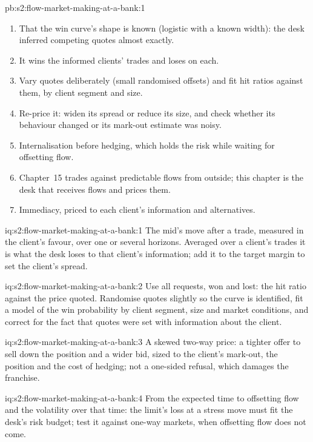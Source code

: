 \begin{solution}{pb:s2:flow-market-making-at-a-bank:1}
\begin{enumerate}
informed out, and internalises 90.8\% of its volume, 96.8\% with a 0.05 skew.
\item That the win curve's shape is known (logistic with a known width): the desk inferred competing quotes almost exactly.
\item It wins the informed clients' trades and loses on each.
\item Vary quotes deliberately (small randomised offsets) and fit hit ratios against them, by client segment and size.
\item Re-price it: widen its spread or reduce its size, and check whether its behaviour changed or its mark-out estimate was noisy.
\item Internalisation before hedging, which holds the risk while waiting for offsetting flow.
\item Chapter~15 trades against predictable flows from outside; this chapter is the desk that receives flows and prices them.
\item Immediacy, priced to each client's information and alternatives.
\end{enumerate}
\end{solution}

\begin{solution}{iq:s2:flow-market-making-at-a-bank:1}
The mid's move after a trade, measured in the client's favour, over one or several horizons. Averaged over a client's trades it is what the desk loses
to that client's information; add it to the target margin to set the client's spread.
\end{solution}

\begin{solution}{iq:s2:flow-market-making-at-a-bank:2}
Use all requests, won and lost: the hit ratio against the price quoted. Randomise quotes slightly so the curve is identified, fit a model of the win
probability by client segment, size and market conditions, and correct for the fact that quotes were set with information about the client.
\end{solution}

\begin{solution}{iq:s2:flow-market-making-at-a-bank:3}
A skewed two-way price: a tighter offer to sell down the position and a wider bid, sized to the client's mark-out, the position and the cost of
hedging; not a one-sided refusal, which damages the franchise.
\end{solution}

\begin{solution}{iq:s2:flow-market-making-at-a-bank:4}
From the expected time to offsetting flow and the volatility over that time: the limit's loss at a stress move must fit the desk's risk budget; test
it against one-way markets, when offsetting flow does not come.
\end{solution}

